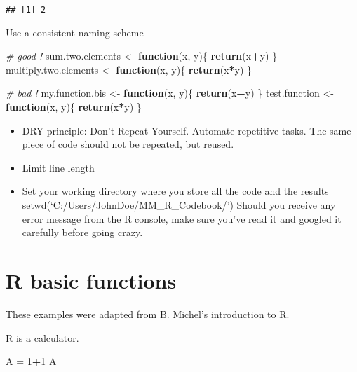 \documentclass[
]{book}
\newenvironment{Shaded}{\begin{snugshade}}{\end{snugshade}}
\newcommand{\CommentTok}[1]{\textcolor[rgb]{0.56,0.35,0.01}{\textit{#1}}}
\newcommand{\ControlFlowTok}[1]{\textcolor[rgb]{0.13,0.29,0.53}{\textbf{#1}}}
\newcommand{\DecValTok}[1]{\textcolor[rgb]{0.00,0.00,0.81}{#1}}
\newcommand{\FunctionTok}[1]{\textcolor[rgb]{0.13,0.29,0.53}{\textbf{#1}}}
\newcommand{\NormalTok}[1]{#1}
\newcommand{\OtherTok}[1]{\textcolor[rgb]{0.56,0.35,0.01}{#1}}
\newcommand{\SpecialCharTok}[1]{\textcolor[rgb]{0.81,0.36,0.00}{\textbf{#1}}}
\providecommand{\tightlist}{%
  \setlength{\itemsep}{0pt}\setlength{\parskip}{0pt}}
\begin{document}
\begin{verbatim}
## [1] 2
\end{verbatim}

Use a consistent naming scheme

\begin{Shaded}
\begin{Highlighting}[]
\CommentTok{\# good !}
\NormalTok{sum.two.elements }\OtherTok{\textless{}{-}} \ControlFlowTok{function}\NormalTok{(x, y)\{}
  \FunctionTok{return}\NormalTok{(x}\SpecialCharTok{+}\NormalTok{y)}
\NormalTok{\}}
\NormalTok{multiply.two.elements }\OtherTok{\textless{}{-}} \ControlFlowTok{function}\NormalTok{(x, y)\{}
  \FunctionTok{return}\NormalTok{(x}\SpecialCharTok{*}\NormalTok{y)}
\NormalTok{\}}

\CommentTok{\# bad !}
\NormalTok{my.function.bis }\OtherTok{\textless{}{-}} \ControlFlowTok{function}\NormalTok{(x, y)\{}
  \FunctionTok{return}\NormalTok{(x}\SpecialCharTok{+}\NormalTok{y)}
\NormalTok{\}}
\NormalTok{test.function }\OtherTok{\textless{}{-}} \ControlFlowTok{function}\NormalTok{(x, y)\{}
  \FunctionTok{return}\NormalTok{(x}\SpecialCharTok{*}\NormalTok{y)}
\NormalTok{\}}
\end{Highlighting}
\end{Shaded}

\begin{itemize}
\tightlist
\item
  DRY principle: Don't Repeat Yourself. Automate repetitive tasks. The same piece of code should not be repeated, but reused.
\item
  Limit line length
\item
  Set your working directory where you store all the code and the results setwd(`C:/Users/JohnDoe/MM\_R\_Codebook/')
  Should you receive any error message from the R console, make sure you've read it and googled it carefully before going crazy.
\end{itemize}

\hypertarget{r-basic-functions}{%
\chapter{R basic functions}\label{r-basic-functions}}

These examples were adapted from B. Michel's \href{http://bertrand.michel.perso.math.cnrs.fr/Enseignements.html}{introduction to R}.

R is a calculator.

\begin{Shaded}
\begin{Highlighting}[]
\NormalTok{A }\OtherTok{=} \DecValTok{1}\SpecialCharTok{+}\DecValTok{1}
\NormalTok{A}
\end{Highlighting}
\end{Shaded}
\end{document}
